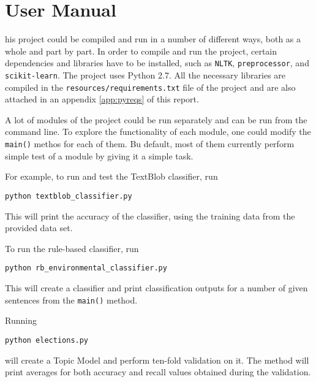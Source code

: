 
\chapter{User Manual}
\label{app:manual}

his project could be compiled and run in a number of different ways, both as a whole and part by part. In order to compile and run the project, certain dependencies and libraries have to be installed, such as \texttt{NLTK}, \texttt{preprocessor}, and \texttt{scikit-learn}. The project uses Python 2.7. All the necessary libraries are compiled in the \texttt{resources/requirements.txt} file of the project and are also attached in an appendix \ref{app:pyreqs} of this report. 

A lot of modules of the project could be run separately and can be run from the command line. To explore the functionality of each module, one could modify the \texttt{main()} methos for each of them. Bu default, most of them currently perform simple test of a module by giving it a simple task.

\par For example, to run and test the TextBlob classifier, run

\begin{center}
\texttt{python textblob\_classifier.py}
\end{center}

This will print the accuracy of the classifier, using the training data from the provided data set.

\par To run the rule-based classifier, run

\begin{center}
\texttt{python rb\_environmental\_classifier.py}
\end{center}

This will create a classifier and print classification outputs for a number of given sentences from the \texttt{main()} method.

\par
Running
\begin{center}
\texttt{python elections.py}
\end{center}

will create a Topic Model and perform ten-fold validation on it. The method will print averages for both accuracy and recall values obtained during the validation.

